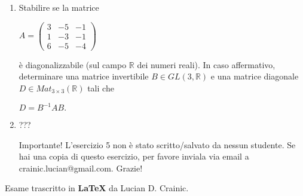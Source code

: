 \documentclass[fleqn]{article}
\begin{document}
\begin{enumerate}
   \item Stabilire se la matrice 
   \begin{center}
    $
    A = \begin{pmatrix}
       3 & -5 & -1 \\
       1 & -3 & -1 \\
       6 & -5 & -4
    \end{pmatrix}
    $
    \end{center}
   è diagonalizzabile (sul campo $\mathbb{R}$ dei numeri reali). In caso affermativo, determinare una matrice invertibile
   $B \in GL(3,\mathbb{R})$ e una matrice diagonale $D \in Mat_{3 \times 3}(\mathbb{R})$ tali che  
   \begin{center}
      $D= B^{-1}AB.$
   \end{center}
   
   \item ??? 
   \begin{bclogo}[logo=\bcattention, couleurBarre=red, noborder=true, 
               couleur=LightSalmon]{Importante!}
    L'esercizio 5 non è stato scritto/salvato da nessun studente. 
    Se hai una copia di questo esercizio, per favore inviala via email a crainic.lucian@gmail.com. Grazie!
\end{bclogo}
\end{enumerate}
Esame trascritto in \textbf{\LaTeX} da Lucian D. Crainic.
\end{document}
